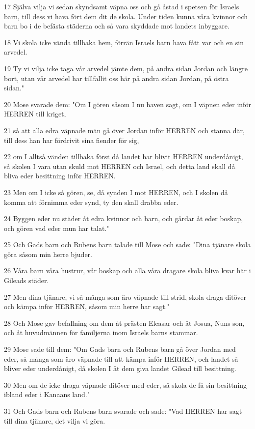 \par 17 Själva vilja vi sedan skyndsamt väpna oss och gå åstad i spetsen för Israels barn, till dess vi hava fört dem dit de skola. Under tiden kunna våra kvinnor och barn bo i de befästa städerna och så vara skyddade mot landets inbyggare.
\par 18 Vi skola icke vända tillbaka hem, förrän Israels barn hava fått var och en sin arvedel.
\par 19 Ty vi vilja icke taga vår arvedel jämte dem, på andra sidan Jordan och längre bort, utan vår arvedel har tillfallit oss här på andra sidan Jordan, på östra sidan."
\par 20 Mose svarade dem: "Om I gören såsom I nu haven sagt, om I väpnen eder inför HERREN till kriget,
\par 21 så att alla edra väpnade män gå över Jordan inför HERREN och stanna där, till dess han har fördrivit sina fiender för sig,
\par 22 om I alltså vänden tillbaka först då landet har blivit HERREN underdånigt, så skolen I vara utan skuld mot HERREN och Israel, och detta land skall då bliva eder besittning inför HERREN.
\par 23 Men om I icke så gören, se, då synden I mot HERREN, och I skolen då komma att förnimma eder synd, ty den skall drabba eder.
\par 24 Byggen eder nu städer åt edra kvinnor och barn, och gårdar åt eder boskap, och gören vad eder mun har talat."
\par 25 Och Gads barn och Rubens barn talade till Mose och sade: "Dina tjänare skola göra såsom min herre bjuder.
\par 26 Våra barn våra hustrur, vår boskap och alla våra dragare skola bliva kvar här i Gileads städer.
\par 27 Men dina tjänare, vi så många som äro väpnade till strid, skola draga ditöver och kämpa inför HERREN, såsom min herre har sagt."
\par 28 Och Mose gav befallning om dem åt prästen Eleasar och åt Josua, Nuns son, och åt huvudmännen för familjerna inom Israels barns stammar.
\par 29 Mose sade till dem: "Om Gads barn och Rubens barn gå över Jordan med eder, så många som äro väpnade till att kämpa inför HERREN, och landet så bliver eder underdånigt, då skolen I åt dem giva landet Gilead till besittning.
\par 30 Men om de icke draga väpnade ditöver med eder, så skola de få sin besittning ibland eder i Kanaans land."
\par 31 Och Gads barn och Rubens barn svarade och sade: "Vad HERREN har sagt till dina tjänare, det vilja vi göra.
